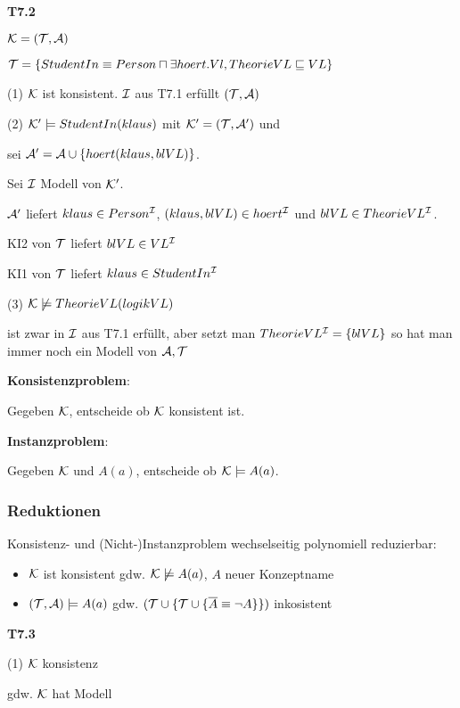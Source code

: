 \textbf{T7.2}

$\mathcal{K} = (\mathcal{T}, \mathcal{A})$

$\mathcal{T} = \{StudentIn \equiv Person \sqcap \exists hoert.Vl, TheorieVL \sqsubseteq VL\}$

(1) $\mathcal{K}$ ist konsistent. $\mathcal{I}$ aus T7.1 erfüllt $(\mathcal{T},\mathcal{A})$

(2) $\mathcal{K}' \models StudentIn(klaus)$ mit $\mathcal{K}' = (\mathcal{T}, \mathcal{A}')$ und 

sei $\mathcal{A}' = \mathcal{A} \cup \{hoert(klaus,blVL)\}$.

Sei $\mathcal{I}$ Modell von $\mathcal{K}'$. 

$\mathcal{A}'$ liefert $klaus \in Person^{\mathcal{I}}$, $(klaus,blVL) \in hoert^{\mathcal{I}}$ und $blVL \in TheorieVL^{\mathcal{I}}$.

KI2 von $\mathcal{T}$ liefert $blVL \in VL^{\mathcal{I}}$

KI1 von $\mathcal{T}$ liefert $klaus \in StudentIn^{\mathcal{I}}$

(3) $\mathcal{K} \not\models TheorieVL(logikVL)$

    ist zwar in $\mathcal{I}$ aus T7.1 erfüllt, aber setzt man $TheorieVL^{\mathcal{I}} = \{blVL \}$ so hat man immer noch ein Modell von $\mathcal{A},\mathcal{T}$ 

\textbf{Konsistenzproblem}:

Gegeben $\mathcal{K}$, entscheide ob $\mathcal{K}$ konsistent ist.

\textbf{Instanzproblem}:

Gegeben $\mathcal{K}$ und $A(a)$, entscheide ob $\mathcal{K} \models A(a)$.

\subsubsection{Reduktionen}

Konsistenz- und (Nicht-)Instanzproblem wechselseitig polynomiell reduzierbar:

\begin{lemma} 

\begin{itemize}
	\item $\mathcal{K}$ ist konsistent gdw. $\mathcal{K} \not\models A(a)$, $A$ neuer Konzeptname
	\item $(\mathcal{T}, \mathcal{A}) \models A(a)$ gdw. $(\mathcal{T} \cup \{\mathcal{T} \cup \{\overline{A} \equiv \neg A\}\})$ inkosistent
\end{itemize}
\end{lemma}

\textbf{T7.3}

(1) $\mathcal{K}$ konsistenz

gdw. $\mathcal{K}$ hat Modell

